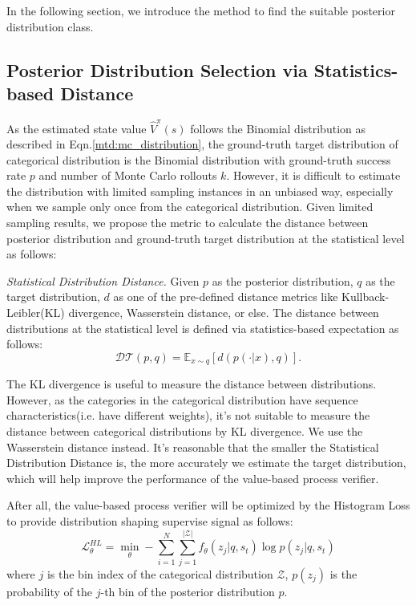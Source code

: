 In the following section, we introduce the method to find the suitable posterior distribution class.

\subsection{Posterior Distribution Selection via Statistics-based Distance}
As the estimated state value $\hat{V}^\pi(s)$ follows the Binomial distribution as described in Eqn.\ref{mtd:mc_distribution}, the ground-truth target distribution of categorical distribution is the Binomial distribution with ground-truth success rate $p$ and number of Monte Carlo rollouts $k$. However, it is difficult to estimate the distribution with limited sampling instances in an unbiased way, especially when we sample only once from the categorical distribution. Given limited sampling results, we propose the metric to calculate the distance between posterior distribution and ground-truth target distribution at the statistical level as follows:
\begin{definition}
    \textit{Statistical Distribution Distance.} Given $p$ as the posterior distribution, $q$ as the target distribution, $d$ as one of the pre-defined distance metrics like Kullback-Leibler(KL) divergence, Wasserstein distance, or else. The distance between distributions at the statistical level is defined via statistics-based expectation as follows:
    \begin{equation}
        \mathcal{DT}(p,q)=\mathbb{E}_{x\sim q}[d(p(\cdot|x),q)].
    \end{equation}
\end{definition}
The KL divergence is useful to measure the distance between distributions. However, as the categories in the categorical distribution have sequence characteristics(i.e. have different weights), it's not suitable to measure the distance between categorical distributions by KL divergence. We use the Wasserstein distance instead. It's reasonable that the smaller the Statistical Distribution Distance is, the more accurately we estimate the target distribution, which will help improve the performance of the value-based process verifier.

After all, the value-based process verifier will be optimized by the Histogram Loss to provide distribution shaping supervise signal as follows:
\begin{equation}\label{mtd:hl}
    \mathcal{L}_\theta^{HL}=\min_\theta-\sum_{i=1}^N\sum_{j=1}^{|\mathcal{Z}|}f_\theta(z_j|q,s_t)\log p(z_j|q,s_t)
\end{equation}
where $j$ is the bin index of the categorical distribution $\mathcal{Z}$, $p(z_j)$ is the probability of the $j$-th bin of the posterior distribution $p$.